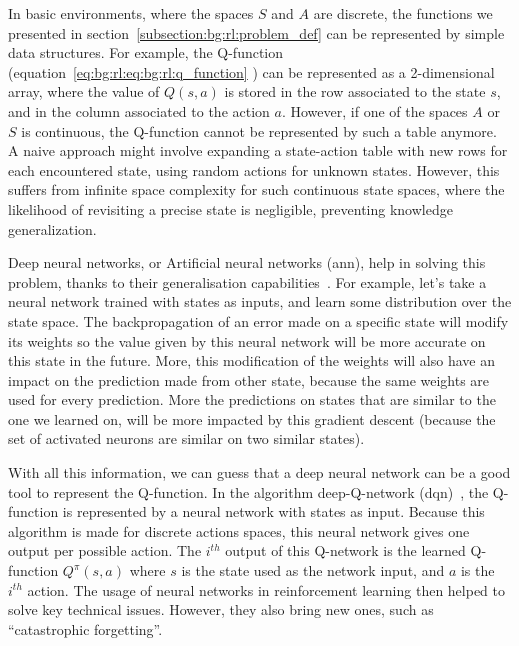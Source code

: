 In basic environments, where the spaces $S$ and $A$ are discrete, the functions we presented in
section~\ref{subsection:bg:rl:problem_def} can be represented by simple data structures.
For example, the Q-function (equation~\ref{eq:bg:rl:eq:bg:rl:q_function}
) can be represented as a 2-dimensional array,
where the value of $Q(s, a)$ is stored in the row associated to the state $s$, and in the column associated to the
action $a$.
However, if one of the spaces $A$ or $S$ is continuous, the Q-function cannot be represented by such a table anymore.
A naive approach might involve expanding a state-action table with new rows for each encountered state, using random 
actions for unknown states. 
However, this suffers from infinite space complexity for such continuous state spaces, where the likelihood of revisiting 
a precise state is negligible, preventing knowledge generalization.

Deep neural networks, or Artificial neural networks (\acrshort{ann}), help in solving this problem, thanks to their 
generalisation capabilities~\citep{zhang2021understanding}.
For example, let's take a neural network trained with states as inputs, and learn some distribution over the state
space.
The backpropagation of an error made on a specific state will modify its weights so the value given by this neural 
network will be more accurate on this state in the future.
More, this modification of the weights will also have an impact on the prediction made from other state,
because the same weights are used for every prediction. 
More the predictions on states that are similar to the one we learned on, will be more impacted by this gradient 
descent (because the set of activated neurons are similar on two similar states).

With all this information, we can guess that a deep neural network can be a good tool to represent the Q-function.
In the algorithm deep-Q-network (\acrshort{dqn})~\citep{mnih2013playing}, the Q-function is represented by a neural network with
states as input.
Because this algorithm is made for discrete actions spaces, this neural network gives one output per possible
action.
The $i^{th}$ output of this Q-network is the learned Q-function $Q^\pi(s, a)$ where $s$ is the state used as the
network input, and $a$ is the $i^{th}$ action. %
The usage of neural networks in reinforcement learning then helped to solve key technical issues.
However, they also bring new ones, such as ``catastrophic forgetting''.

